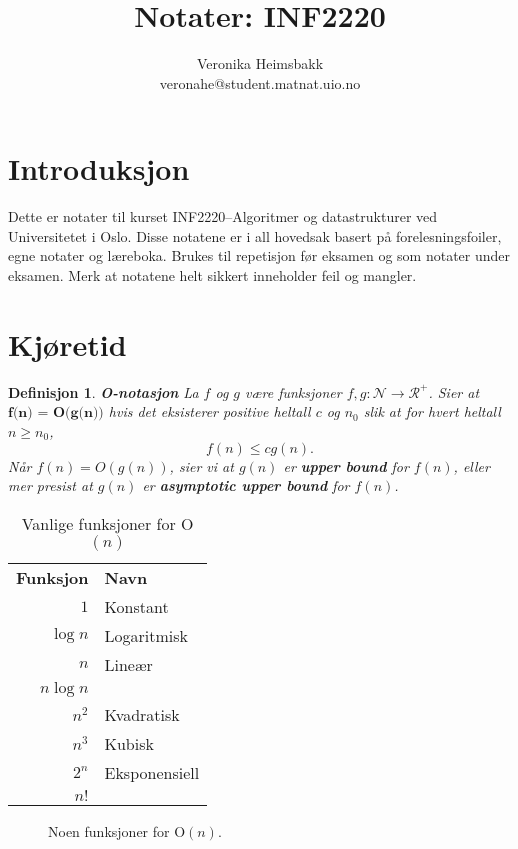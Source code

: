 \documentclass[11pt,a4paper]{article}
\title{Notater: INF2220}
\author{Veronika Heimsbakk \\ 
veronahe@student.matnat.uio.no}
\theoremstyle{def}
\newtheorem{definition}[subsection]{Definisjon}
\begin{document}
\maketitle{}
\tableofcontents
\newpage{}

\section*{Introduksjon}
Dette er notater til kurset INF2220--Algoritmer og datastrukturer ved Universitetet i Oslo. Disse notatene er i all hovedsak basert på forelesningsfoiler, egne notater og læreboka. Brukes til repetisjon før eksamen og som notater under eksamen. Merk at notatene helt sikkert inneholder feil og mangler.


\section{Kjøretid}

\begin{definition}
\emph{\textbf{O-notasjon}}
La $f$ og $g$ være funksjoner $f,g: \mathcal{N} \rightarrow \mathcal{R}^+$. Sier at $\textbf{f(n) = O(g(n))}$ hvis det eksisterer positive heltall $c$ og $n_0$ slik at for hvert heltall $n \geq n_0$,
$$f(n) \leq c g(n).$$
Når $f(n) = O(g(n))$, sier vi at $g(n)$ er \textbf{upper bound} for $f(n)$, eller mer presist at $g(n)$ er \textbf{asymptotic upper bound} for $f(n)$.
\end{definition}

\begin{table}[h!]
\centering
\begin{tabular}{rl}
\textbf{Funksjon}&\textbf{Navn}\\
$1$&Konstant\\
$\log n$&Logaritmisk\\
$n$&Lineær\\
$n \log n$&\\
$n^2$&Kvadratisk\\
$n^3$&Kubisk\\
$2^n$&Eksponensiell\\
$n!$&\\
\end{tabular}
\label{tab:ofunc}
\caption{Vanlige funksjoner for O$(n)$}
\end{table}

\begin{figure}[h!]
\centering
{}
\label{fig:ofunc}
\caption{Noen funksjoner for O$(n)$.}
\end{figure}
\end{document}
